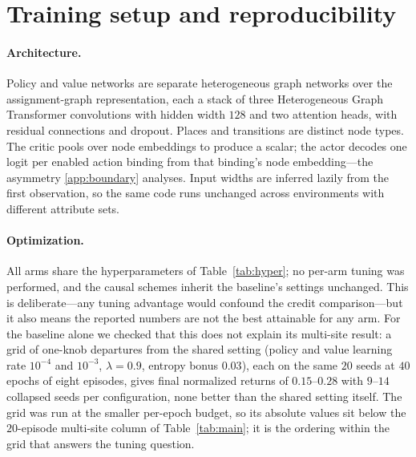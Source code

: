 \documentclass[review,authoryear,3p,times]{elsarticle}
\begin{document}
\section{Training setup and reproducibility}
\label{app:repro}

\paragraph{Architecture.} Policy and value networks are separate heterogeneous
graph networks over the assignment-graph representation, each a stack of three
Heterogeneous Graph Transformer convolutions \citep{hu2020hgt} with hidden width
$128$ and two attention heads, with residual connections and dropout. Places and
transitions are distinct node types. The critic pools over node embeddings to
produce a scalar; the actor decodes one logit per enabled action binding from
that binding's node embedding---the asymmetry \ref{app:boundary}
analyses. Input widths are inferred lazily from the first observation, so the
same code runs unchanged across environments with different attribute sets.

\paragraph{Optimization.} All arms share the hyperparameters of
Table~\ref{tab:hyper}; no per-arm tuning was performed, and the causal schemes
inherit the baseline's settings unchanged. This is deliberate---any tuning
advantage would confound the credit comparison---but it also means the reported
numbers are not the best attainable for any arm. For the baseline alone we
checked that this does not explain its multi-site result: a grid of one-knob
departures from the shared setting (policy and value learning rate $10^{-4}$
and $10^{-3}$, $\lambda=0.9$, entropy bonus $0.03$), each on the same $20$
seeds at $40$ epochs of eight episodes, gives final normalized returns of
$0.15$--$0.28$ with $9$--$14$ collapsed seeds per configuration, none better
than the shared setting itself. The grid was run at the smaller per-epoch
budget, so its absolute values sit below the $20$-episode multi-site column of
Table~\ref{tab:main}; it is the ordering within the grid that answers the
tuning question.
\end{document}
